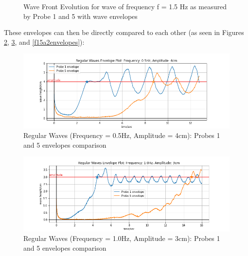 \documentclass{article}
\begin{document}
	\vspace{-.5cm}
	\begin{figure}[H]
		\centering
		\caption{Wave Front Evolution for wave of frequency f = 1.5 Hz as measured by Probe 1 and 5 with wave envelopes}
		\label{wave3envelope}
	\end{figure}
	These envelopes can then be directly compared to each other (as seen in Figures \ref{f05a4envelopes}, \ref{f10a3envelopes}, and \ref{f15a2envelopes}):\\
	\begin{figure}[H]
		\centering
		\includegraphics[clip, trim = {1cm 0.2cm 1cm 0.5cm},width=\textwidth]{../graphs/F05A4Probes1and5Envelope.png}
		\caption{Regular Waves (Frequency = 0.5Hz, Amplitude = 4cm): Probes 1 and 5 envelopes comparison}
		\label{f05a4envelopes}
	\end{figure}
	\vspace{-.5cm}
	\begin{figure}[H]
		\centering
		\includegraphics[clip, trim = {1cm 0.2cm 1cm 0.5cm},width=\textwidth]{../graphs/F10A3Probes1and5Envelope.png}
		\caption{Regular Waves (Frequency = 1.0Hz, Amplitude = 3cm): Probes 1 and 5 envelopes comparison}
		\label{f10a3envelopes}
	\end{figure}
\end{document}
